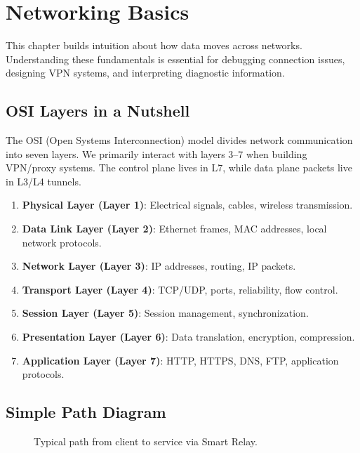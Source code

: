 \chapter{Networking Basics}

This chapter builds intuition about how data moves across networks. Understanding these fundamentals is essential for debugging connection issues, designing VPN systems, and interpreting diagnostic information.

\section{OSI Layers in a Nutshell}

The OSI (Open Systems Interconnection) model divides network communication into seven layers. We primarily interact with layers 3--7 when building VPN/proxy systems. The control plane lives in L7, while data plane packets live in L3/L4 tunnels.

\begin{enumerate}
    \item \textbf{Physical Layer (Layer 1)}: Electrical signals, cables, wireless transmission.
    \item \textbf{Data Link Layer (Layer 2)}: Ethernet frames, MAC addresses, local network protocols.
    \item \textbf{Network Layer (Layer 3)}: IP addresses, routing, IP packets.
    \item \textbf{Transport Layer (Layer 4)}: TCP/UDP, ports, reliability, flow control.
    \item \textbf{Session Layer (Layer 5)}: Session management, synchronization.
    \item \textbf{Presentation Layer (Layer 6)}: Data translation, encryption, compression.
    \item \textbf{Application Layer (Layer 7)}: HTTP, HTTPS, DNS, FTP, application protocols.
\end{enumerate}

\section{Simple Path Diagram}
\begin{figure}[h]
    \centering
    \caption{Typical path from client to service via Smart Relay.}
\end{figure}

